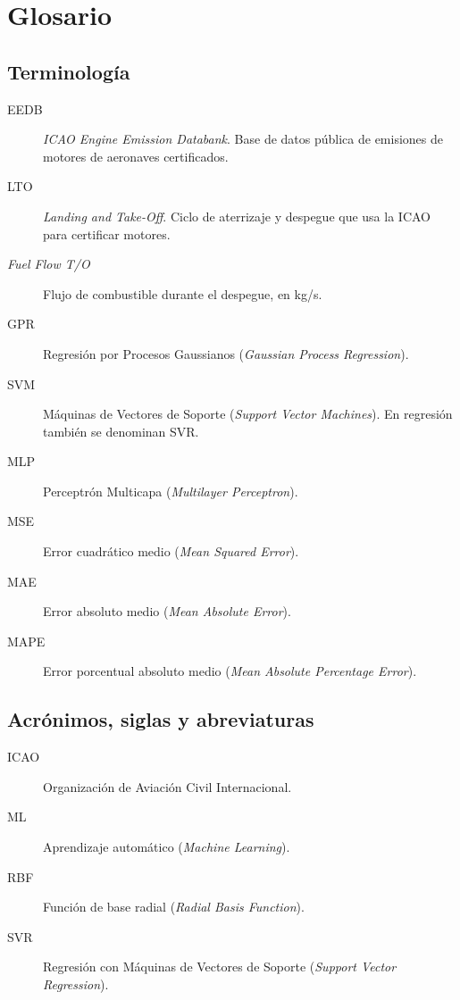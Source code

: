 \thispagestyle{empty}

\chapter*{Glosario}

\section*{Terminología}

\begin{description}
    \item[EEDB] \textit{ICAO Engine Emission Databank}. Base de datos pública de emisiones de motores de aeronaves certificados.
    \item[LTO] \textit{Landing and Take-Off}. Ciclo de aterrizaje y despegue que usa la ICAO para certificar motores.
    \item[\textit{Fuel Flow T/O}] Flujo de combustible durante el despegue, en kg/s.
    \item[GPR] Regresión por Procesos Gaussianos (\textit{Gaussian Process Regression}).
    \item[SVM] Máquinas de Vectores de Soporte (\textit{Support Vector Machines}). En regresión también se denominan SVR.
    \item[MLP] Perceptrón Multicapa (\textit{Multilayer Perceptron}).
    \item[MSE] Error cuadrático medio (\textit{Mean Squared Error}).
    \item[MAE] Error absoluto medio (\textit{Mean Absolute Error}).
    \item[MAPE] Error porcentual absoluto medio (\textit{Mean Absolute Percentage Error}).
\end{description}

\section*{Acrónimos, siglas y abreviaturas}

\begin{description}
    \item[ICAO] Organización de Aviación Civil Internacional.
    \item[ML] Aprendizaje automático (\textit{Machine Learning}).
    \item[RBF] Función de base radial (\textit{Radial Basis Function}).
    \item[SVR] Regresión con Máquinas de Vectores de Soporte (\textit{Support Vector Regression}).
\end{description}

